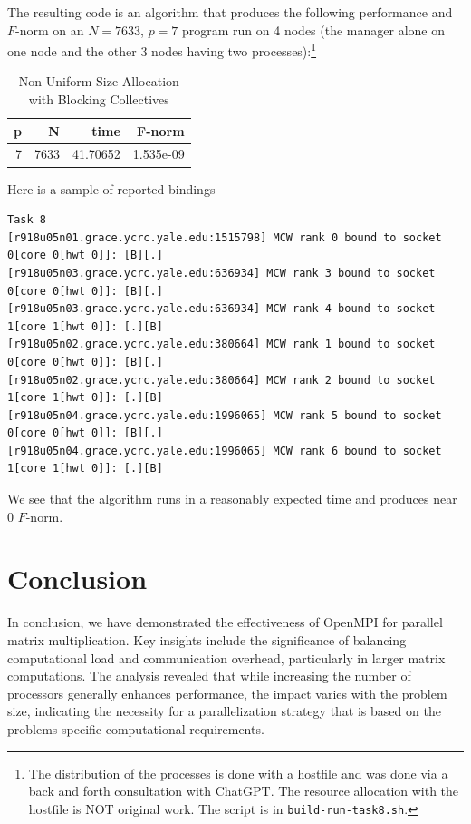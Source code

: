 \documentclass{article}
\begin{document}
\begin{itemize}
\end{itemize}
The resulting code is an algorithm that produces the following performance and 
$F$-norm on an $N = 7633$, $p = 7$ program run on 4 nodes (the manager alone 
on one node and the other 3 nodes having two processes):\footnote{
    The distribution of the processes is done with a hostfile and was done via 
    a back and forth consultation with ChatGPT. The resource allocation with the 
    hostfile is NOT original work. The script is in \texttt{build-run-task8.sh}.
}
\begin{table}[H]
    \centering
    \caption{Non Uniform Size Allocation with Blocking Collectives}
    \fontsize{12}{14}\selectfont
    \begin{tabular}[t]{rrrr}
    \toprule
    p & N & time & F-norm\\
    \midrule
    7 & 7633 & 41.70652 & 1.535e-09\\
    \bottomrule
    \end{tabular}
\end{table}
\noindent Here is a sample of reported bindings
\begin{verbatim}
Task 8
[r918u05n01.grace.ycrc.yale.edu:1515798] MCW rank 0 bound to socket 0[core 0[hwt 0]]: [B][.]
[r918u05n03.grace.ycrc.yale.edu:636934] MCW rank 3 bound to socket 0[core 0[hwt 0]]: [B][.]
[r918u05n03.grace.ycrc.yale.edu:636934] MCW rank 4 bound to socket 1[core 1[hwt 0]]: [.][B]
[r918u05n02.grace.ycrc.yale.edu:380664] MCW rank 1 bound to socket 0[core 0[hwt 0]]: [B][.]
[r918u05n02.grace.ycrc.yale.edu:380664] MCW rank 2 bound to socket 1[core 1[hwt 0]]: [.][B]
[r918u05n04.grace.ycrc.yale.edu:1996065] MCW rank 5 bound to socket 0[core 0[hwt 0]]: [B][.]
[r918u05n04.grace.ycrc.yale.edu:1996065] MCW rank 6 bound to socket 1[core 1[hwt 0]]: [.][B]
\end{verbatim}
We see that the algorithm runs in a reasonably expected time and produces near 
0 $F$-norm.

\section{Conclusion}
In conclusion, we have demonstrated the effectiveness of OpenMPI for parallel matrix multiplication.
Key insights include the significance of balancing computational load and communication overhead, 
particularly in larger matrix computations. The analysis revealed that while increasing the 
number of processors generally enhances performance, the impact varies with the problem size, 
indicating the necessity for a parallelization strategy that is based on the problems
specific computational requirements. 
\end{document}
